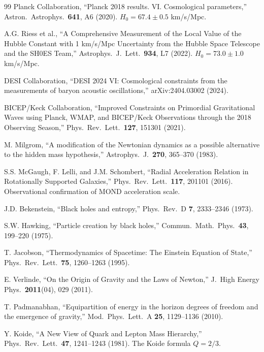 \documentclass[11pt,a4paper]{article}
\theoremstyle{plain}
\theoremstyle{definition}
\theoremstyle{remark}
\begin{document}
\begin{thebibliography}{99}
 Planck Collaboration, ``Planck 2018 results. VI. Cosmological parameters,'' Astron.\ Astrophys.\ \textbf{641}, A6 (2020). $H_0 = 67.4 \pm 0.5$ km/s/Mpc.

 A.G. Riess et al., ``A Comprehensive Measurement of the Local Value of the Hubble Constant with 1 km/s/Mpc Uncertainty from the Hubble Space Telescope and the SH0ES Team,'' Astrophys.\ J.\ Lett.\ \textbf{934}, L7 (2022). $H_0 = 73.0 \pm 1.0$ km/s/Mpc.

 DESI Collaboration, ``DESI 2024 VI: Cosmological constraints from the measurements of baryon acoustic oscillations,'' arXiv:2404.03002 (2024).

 BICEP/Keck Collaboration, ``Improved Constraints on Primordial Gravitational Waves using Planck, WMAP, and BICEP/Keck Observations through the 2018 Observing Season,'' Phys.\ Rev.\ Lett.\ \textbf{127}, 151301 (2021).

 M. Milgrom, ``A modification of the Newtonian dynamics as a possible alternative to the hidden mass hypothesis,'' Astrophys.\ J.\ \textbf{270}, 365--370 (1983).

 S.S. McGaugh, F. Lelli, and J.M. Schombert, ``Radial Acceleration Relation in Rotationally Supported Galaxies,'' Phys.\ Rev.\ Lett.\ \textbf{117}, 201101 (2016). Observational confirmation of MOND acceleration scale.

 J.D. Bekenstein, ``Black holes and entropy,'' Phys.\ Rev.\ D \textbf{7}, 2333--2346 (1973).

 S.W. Hawking, ``Particle creation by black holes,'' Commun.\ Math.\ Phys.\ \textbf{43}, 199--220 (1975).

 T. Jacobson, ``Thermodynamics of Spacetime: The Einstein Equation of State,'' Phys.\ Rev.\ Lett.\ \textbf{75}, 1260--1263 (1995).

 E. Verlinde, ``On the Origin of Gravity and the Laws of Newton,'' J.\ High Energy Phys.\ \textbf{2011}(04), 029 (2011).

 T. Padmanabhan, ``Equipartition of energy in the horizon degrees of freedom and the emergence of gravity,'' Mod.\ Phys.\ Lett.\ A \textbf{25}, 1129--1136 (2010).

 Y. Koide, ``A New View of Quark and Lepton Mass Hierarchy,'' Phys.\ Rev.\ Lett.\ \textbf{47}, 1241--1243 (1981). The Koide formula $Q = 2/3$.


\end{thebibliography}
\end{document}
